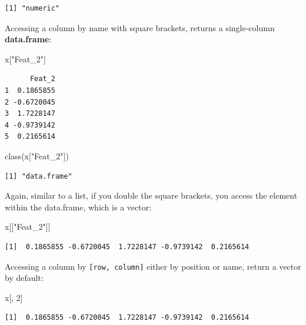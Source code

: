 \documentclass[
]{book}
\newenvironment{Shaded}{\begin{snugshade}}{\end{snugshade}}
\newcommand{\DecValTok}[1]{\textcolor[rgb]{0.00,0.00,0.81}{#1}}
\newcommand{\FunctionTok}[1]{\textcolor[rgb]{0.00,0.00,0.00}{#1}}
\newcommand{\NormalTok}[1]{#1}
\newcommand{\StringTok}[1]{\textcolor[rgb]{0.31,0.60,0.02}{#1}}
\begin{document}
\begin{verbatim}
[1] "numeric"
\end{verbatim}

Accessing a column by name with square brackets, returns a single-column \textbf{data.frame}:

\begin{Shaded}
\begin{Highlighting}[]
\NormalTok{x[}\StringTok{"Feat\_2"}\NormalTok{]}
\end{Highlighting}
\end{Shaded}

\begin{verbatim}
      Feat_2
1  0.1865855
2 -0.6720045
3  1.7228147
4 -0.9739142
5  0.2165614
\end{verbatim}

\begin{Shaded}
\begin{Highlighting}[]
\FunctionTok{class}\NormalTok{(x[}\StringTok{"Feat\_2"}\NormalTok{])}
\end{Highlighting}
\end{Shaded}

\begin{verbatim}
[1] "data.frame"
\end{verbatim}

Again, similar to a list, if you double the square brackets, you access the element within the data.frame, which is a vector:

\begin{Shaded}
\begin{Highlighting}[]
\NormalTok{x[[}\StringTok{"Feat\_2"}\NormalTok{]]}
\end{Highlighting}
\end{Shaded}

\begin{verbatim}
[1]  0.1865855 -0.6720045  1.7228147 -0.9739142  0.2165614
\end{verbatim}

Accessing a column by \texttt{{[}row,\ column{]}} either by position or name, return a vector by default:

\begin{Shaded}
\begin{Highlighting}[]
\NormalTok{x[, }\DecValTok{2}\NormalTok{]}
\end{Highlighting}
\end{Shaded}

\begin{verbatim}
[1]  0.1865855 -0.6720045  1.7228147 -0.9739142  0.2165614
\end{verbatim}
\end{document}
